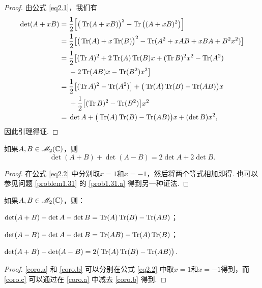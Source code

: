 \begin{proof}
  由公式 \eqref{eq2.1}，我们有
  \begin{align*}
    \det(A + xB) = {}& \frac12\left[ \big( \Tr(A + xB) \big)^2 - \Tr\big( (A + xB)^2 \big) \right]\\
    = {}& \frac12\big[ \big(\Tr(A)+x\Tr(B)\big)^2 - \Tr(A^2+xAB+xBA+B^2x^2) \big] \\
    = {}& \frac12\big[ (\Tr A)^2 + 2\Tr(A)\Tr(B)x +
     (\Tr B)^2x^2 - \Tr(A^2)\\
     & - 2\Tr(AB)x - \Tr(B^2)x^2 \big] \\
    = {}& \frac12\big[ (\Tr A)^2 - \Tr(A^2) \big]
      + \big( \Tr(A)\Tr(B) - \Tr(AB) \big)x \\
      & + \frac12\big[ (\Tr B)^2 - \Tr(B^2) \big]x^2 \\
    = {}& \det A + \big(
        \Tr(A)\Tr(B) - \Tr(AB)
      \big)x + (\det B)x^2,
  \end{align*}
  因此引理得证.
\end{proof}

\begin{corollary}
  如果$A,B\in\mathscr M_2(\mathbb C)$，则
  \[
    \det (A + B) + \det(A - B) = 2\det A + 2\det B.
  \]
\end{corollary}
\begin{proof}
  在公式 \eqref{eq2.2} 中分别取$x=1$和$x=-1$，然后将两个等式相加即得. 也可以参见问题 \ref{problem1.31} 的 \ref{prob1.31.a} 得到另一种证法.
\end{proof}

\begin{mybox}
  \begin{corollary}[行列式和迹的性质.]

    如果$A,B\in\mathscr M_2(\mathbb C)$，则：
    \begin{enum}
      \item\label{coro.a} $\det(A+B)-\det A-\det B=\operatorname{Tr}(A)\operatorname{Tr}(B)-\operatorname{Tr}(AB)$；
      \item\label{coro.b} $\det(A-B)-\det A-\det B=\operatorname{Tr}(AB)-\operatorname{Tr}(A)\operatorname{Tr}(B)$；
      \item\label{coro.c} $\det(A+B)-\det(A-B)=2\big(
      \operatorname{Tr}(A)\operatorname{Tr}(B)-\operatorname{Tr}(AB)\big)$.
    \end{enum}
  \end{corollary}
\end{mybox}

\begin{proof}
  \ref{coro.a} 和 \ref{coro.b} 可以分别在公式 \eqref{eq2.2} 中取$x=1$和$x=-1$得到，而 \ref{coro.c} 可以通过在 \ref{coro.a} 中减去 \ref{coro.b} 得到.
\end{proof}

